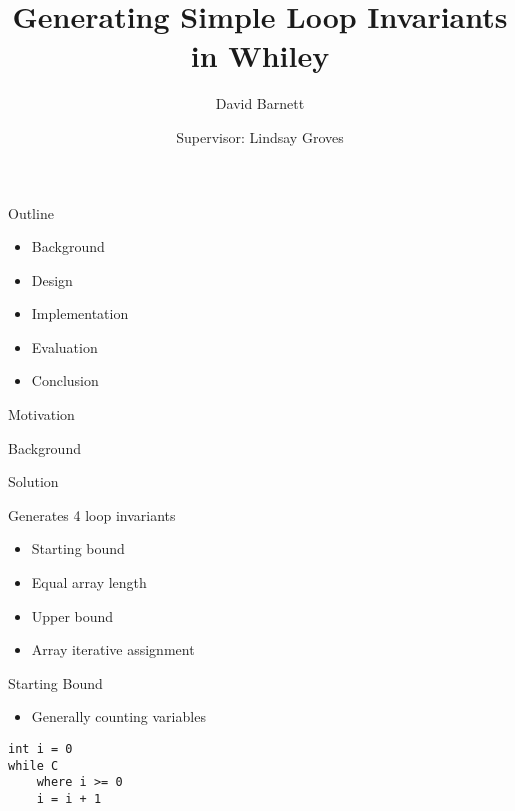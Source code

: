 

\title{Generating Simple Loop Invariants in Whiley}
\author{David Barnett}
\date{Supervisor: Lindsay Groves}


\frame{\titlepage}

\begin{frame}{Outline}

\begin{itemize}
\tightlist
\item
  Background
\item
  Design
\item
  Implementation
\item
  Evaluation
\item
  Conclusion
\end{itemize}

\end{frame}

\begin{frame}{Motivation}

\end{frame}

\begin{frame}{Background}

\end{frame}

\begin{frame}{Solution}

Generates 4 loop invariants

\begin{itemize}
\tightlist
\item
  Starting bound
\item
  Equal array length
\item
  Upper bound
\item
  Array iterative assignment
\end{itemize}

\end{frame}

\begin{frame}[fragile]{Starting Bound}

\begin{itemize}
\tightlist
\item
  Generally counting variables
\end{itemize}

\begin{verbatim}
int i = 0
while C
    where i >= 0
    i = i + 1
\end{verbatim}

\end{frame}

